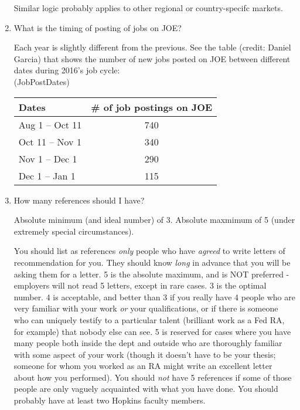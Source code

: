 \documentclass{econtex}
\providecommand\phantomsection{}
\begin{document}
\begin{enumerate}
  Similar logic probably applies to other regional or country-specifc markets.

\item What is the timing of posting of jobs on JOE? 

  Each year is slightly different from the previous. See the table (credit: Daniel Garcia) 
 that shows the number of new jobs posted on JOE between different dates 
  during 2016's job cycle:\\

  \ifdvi\phantomsection\hypertarget{JobPostDates}{(JobPostDates)}\fi
  
\begin{table}[]
\centering
\begin{tabular}{|l|c|}
\hline
Dates                   & \# of job postings on JOE \\ \hline
Aug 1 -- Oct 11   & 740                       \\ \hline
Oct 11 -- Nov 1 & 340                       \\ \hline
Nov 1 -- Dec 1 & 290                       \\ \hline
Dec 1 -- Jan 1  & 115                       \\ \hline
\end{tabular}
\end{table}

\item How many references should I have?

Absolute minimum (and ideal number) of 3.  Absolute maxmimum of 5 (under
extremely special circumstances).  

You should list as references {\it only} people who have {\it agreed}
to write letters of recommendation for you.  They should know {\it long} in advance that you will be asking them for a letter.  5 is the absolute
maximum, and is NOT preferred - employers will not read 5 letters,
except in rare cases.  3 is the optimal number.  4 is acceptable, and
better than 3 if you really have 4 people who are very familiar with
your work {\it or} your qualifications, or if there is someone who can
uniquely testify to a particular talent (brilliant work as a Fed RA,
for example) that nobody else can see.  5 is reserved for cases where
you have many people both inside the dept and outside who are
thoroughly familiar with some aspect of your work (though it doesn't
have to be your thesis; someone for whom you worked as an RA might
write an excellent letter about how you performed).  You should {\it
  not} have 5 references if some of those people are only vaguely
acquainted with what you have done.  You should probably have at least
two Hopkins faculty members.


\end{enumerate}
\end{document}
